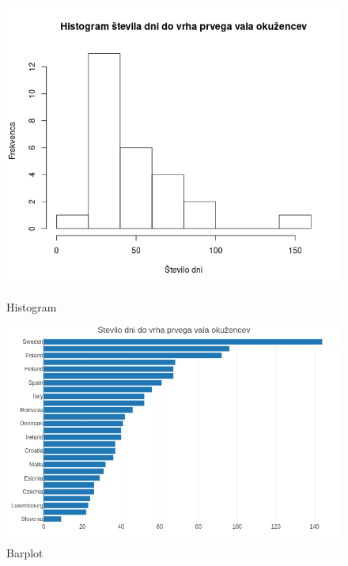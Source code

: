 \documentclass[a4paper,11pt]{article}
\begin{document}
\begin{figure}[!htb]
   \begin{minipage}{0.5\textwidth}
     \centering
     \includegraphics[width=1\linewidth]{histogram_st_dni_do_peaka_okuzencev}
     \caption{Histogram}\label{Fig:Data1}
   \end{minipage}\hfill
   \begin{minipage}{0.5\textwidth}
     \centering
     \includegraphics[width=1\linewidth]{barplot_st_dni_do_peaka_okuzencev}
     \caption{Barplot}\label{Fig:Data2}
   \end{minipage}
\end{figure}
\end{document}
